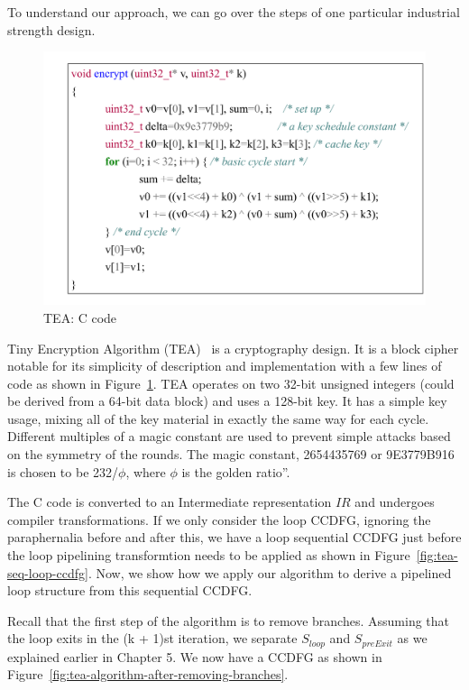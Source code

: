 To understand our approach, we can go over the steps of one particular industrial strength design.

\begin{figure}[H]
\begin{center}
\includegraphics[width=5.5in]{fig-proposal/C-code-tea}
\end{center}
\caption{TEA: C code}
\label{fig:C-code-tea}
\end{figure}

Tiny Encryption Algorithm (TEA)~\cite{book-tea1} is a cryptography design. It is a block cipher notable for its simplicity of description and implementation with a few lines of code as shown in Figure~\ref{fig:C-code-tea}. TEA operates on two 32-bit unsigned integers (could be derived from a 64-bit data block) and uses a 128-bit key.  It has a simple key usage, mixing all of the key material in exactly the same way for each cycle. Different multiples of a magic constant are used to prevent simple attacks based on the symmetry of the rounds. The magic constant, 2654435769 or 9E3779B916 is chosen to be 232/$\phi$, where $\phi$ is the golden ratio''.  

The C code is converted to an Intermediate representation $IR$ and undergoes compiler transformations. If we only consider the loop CCDFG, ignoring the paraphernalia before and after this, we have a loop sequential CCDFG just before the loop pipelining transformtion needs to be applied as shown in Figure~\ref{fig:tea-seq-loop-ccdfg}. Now, we show how we apply our algorithm to derive a pipelined loop structure from this sequential CCDFG. 

Recall that the first step of the algorithm is to remove branches. Assuming that the loop exits in the (k + 1)st iteration, we separate $S_{loop}$ and $S_{preExit}$ as we explained earlier in Chapter 5. We now have a CCDFG as shown in Figure~\ref{fig:tea-algorithm-after-removing-branches}.


